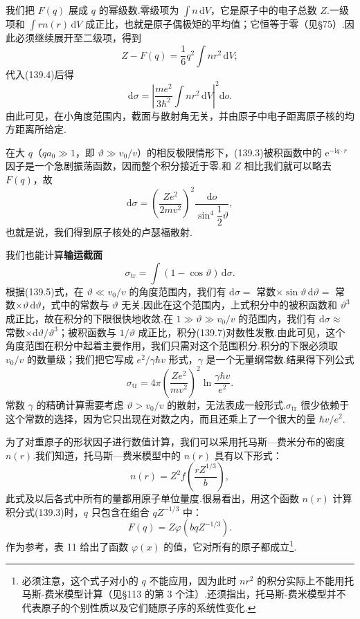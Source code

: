 我们把 $F(q)$ 展成 $q$ 的幂级数.零级项为 $\int n\,\mathrm{d}V$，它是原子中的电子总数 $Z$.一级项和 $\int rn(r)\,\mathrm{d}V$ 成正比，也就是原子偶极矩的平均值；它恒等于零（见§75）.因此必须继续展开至二级项，得到
\begin{equation*}
  Z-F(q)=\frac{1}{6}q^2\int nr^2\,\mathrm{d}V;
\end{equation*}
代入(139.4)后得
\begin{equation}
  \mathrm{d}\sigma=\left|\frac{me^2}{3\hbar^2}
  \int nr^2\,\mathrm{d}V\right|^2\mathrm{d}o.
\end{equation}
由此可见，在小角度范围内，截面与散射角无关，并由原子中电子距离原子核的均方距离所给定.

在大 $q$（$qa_0\gg1$，即 $\vartheta\gg v_0/v$）的相反极限情形下，(139.3)被积函数中的 $\mathrm{e}^{-\mathrm{i}q\cdot r}$ 因子是一个急剧振荡函数，因而整个积分接近于零.和 $Z$ 相比我们就可以略去 $F(q)$，故
\begin{equation}
  \mathrm{d}\sigma=\left(\frac{Ze^2}{2mv^2}\right)^{2}
  \frac{\mathrm{d}o}{\sin^4\dfrac{1}{2}\vartheta},
\end{equation}
也就是说，我们得到原子核处的卢瑟福散射.

我们也能计算\textbf{输运截面}
\begin{equation}
  \sigma_{\mathrm{tr}}=\int(1-\cos\vartheta)\,\mathrm{d}\sigma.
\end{equation}
根据(139.5)式，在 $\vartheta\ll v_0/v$ 的角度范围内，我们有
$\mathrm{d}\sigma=$ 常数$\times\sin\vartheta\,\mathrm{d}\vartheta=$ 常数$\times\vartheta\,\mathrm{d}\vartheta$，式中的常数与 $\vartheta$ 无关.因此在这个范围内，上式积分中的被积函数和 $\vartheta^3$ 成正比，故在积分的下限很快地收敛.在 $1\gg\vartheta\gg v_0/v$ 的范围内，我们有 $\mathrm{d}\sigma\approx$ 常数$\times\mathrm{d}\vartheta/\vartheta^3$；被积函数与 $1/\vartheta$ 成正比，积分(139.7)对数性发散.由此可见，这个角度范围在积分中起着主要作用，我们只需对这个范围积分.积分的下限必须取 $v_0/v$ 的数量级；我们把它写成 $e^2/\gamma\hbar v$ 形式，$\gamma$ 是一个无量纲常数.结果得下列公式
\begin{equation}
  \sigma_{\mathrm{tr}}=4\pi\left(\frac{Ze^2}{mv^2}\right)^{2}
  \ln\frac{\gamma\hbar v}{e^2}.
\end{equation}
常数 $\gamma$ 的精确计算需要考虑 $\vartheta>v_0/v$ 的散射，无法表成一般形式.$\sigma_{\mathrm{tr}}$ 很少依赖于这个常数的选择，因为它只出现在对数之内，而且还乘上了一个很大的量 $\hbar v/e^2$.

为了对重原子的形状因子进行数值计算，我们可以采用托马斯—费米分布的密度 $n(r)$.我们知道，托马斯—费米模型中的 $n(r)$ 具有以下形式：
\begin{equation*}
  n(r)=Z^2f\left(\frac{rZ^{1/3}}{b}\right),
\end{equation*}
此式及以后各式中所有的量都用原子单位量度.很易看出，用这个函数 $n(r)$ 计算积分式(139.3)时，$q$ 只包含在组合 $qZ^{-1/3}$ 中：
\begin{equation}
  F(q)=Z\varphi(bqZ^{-1/3}).
\end{equation}
作为参考，表 11 给出了函数 $\varphi(x)$ 的值，它对所有的原子都成立\footnote{必须注意，这个式子对小的 $q$ 不能应用，因为此时 $nr^2$ 的积分实际上不能用托马斯-费米模型计算（见§113 的第 3 个注）.还须指出，托马斯-费米模型并不代表原子的个别性质以及它们随原子序的系统性变化.}.

